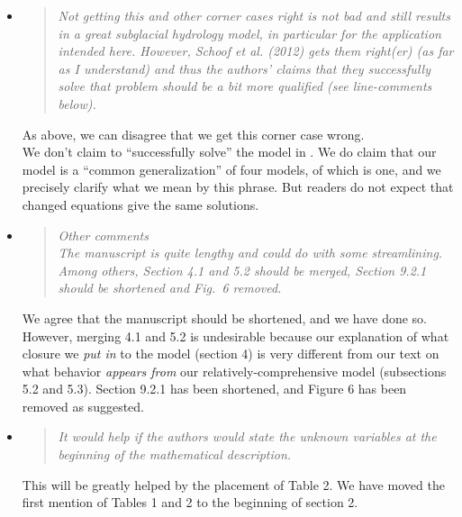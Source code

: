 \documentclass[11pt,reqno]{amsart}
\newcommand{\reply}[2]{
\medskip\medskip
\item  \begin{quote}
\emph{#1}
\end{quote}

\medskip
\noindent #2}
\begin{document}
\begin{itemize}
\reply{Not getting this and other corner cases right is not bad and still results in a great
subglacial hydrology model, in particular for the application intended here. However,
Schoof et al. (2012) gets them right(er) (as far as I understand) and thus the authors'
claims that they successfully solve that problem should be a bit more qualified (see
line-comments below).}
{As above, we can disagree that we get this corner case wrong.\\
\indent We don't claim to ``successfully solve'' the model in \cite{Schoofetal2012}.  We do claim that our model is a ``common generalization'' of four models, of which \cite{Schoofetal2012} is one, and we precisely clarify what we mean by this phrase.  But readers do not expect that changed equations give the same solutions.}

\reply{Other comments\\
The manuscript is quite lengthy and could do with some streamlining. Among others,
Section 4.1 and 5.2 should be merged, Section 9.2.1 should be shortened and Fig.~6
removed.}
{We agree that the manuscript should be shortened, and we have done so.  However, merging 4.1 and 5.2 is undesirable because our explanation of what closure we \emph{put in} to the model (section 4) is very different from our text on what behavior \emph{appears from} our relatively-comprehensive model (subsections 5.2 and 5.3).  Section 9.2.1 has been shortened, and Figure 6 has been removed as suggested.}

\reply{It would help if the authors would state the unknown variables at the beginning of the mathematical description.}
{This will be greatly helped by the placement of Table 2.  We have moved the first mention of Tables 1 and 2 to the beginning of section 2.}


\end{itemize}
\end{document}
